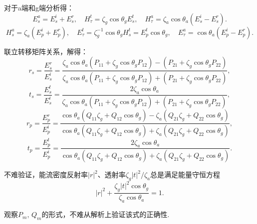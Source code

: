 对于a端和g端分析得：
\begin{equation*}
	E_s^a = E_s^i + E_s^r,\quad H_\tau^t = \zeta_g \cos\theta_g E_s^t,\quad H_\tau^a = \zeta_a \cos\theta_a (E_s^i - E_s^r).
\end{equation*}
\begin{equation*}
	H_s^a = \zeta_a (E_p^i + E_p^r),\quad E_\tau^t = \zeta_g^{-1} \cos\theta_g H_s^t = E_p^t \cos\theta_g,\quad E_\tau^a = \cos\theta_a (E_p^i - E_p^r).
\end{equation*}

联立转移矩阵关系，解得：
\begin{equation*}
	r_s = \dfrac{E_s^r}{E_s^i} = \dfrac{\zeta_a \cos\theta_a (P_{11} + \zeta_g \cos\theta_g P_{12}) - (P_{21} + \zeta_g \cos\theta_g P_{22})}{\zeta_a \cos\theta_a (P_{11} + \zeta_g \cos\theta_g P_{12}) + (P_{21} + \zeta_g \cos\theta_g P_{22})},
\end{equation*}
\begin{equation*}
	t_s = \dfrac{E_s^t}{E_s^i} = \dfrac{2\zeta_a \cos\theta_a}{\zeta_a \cos\theta_a (P_{11} + \zeta_g \cos\theta_g P_{12}) + (P_{21} + \zeta_g \cos\theta_g P_{22})},
\end{equation*}
\begin{equation*}
	r_p = \dfrac{E_p^r}{E_p^i} = \dfrac{\cos\theta_a (Q_{11}\zeta_g + Q_{12}\cos\theta_g) - \zeta_a (Q_{21}\zeta_g + Q_{22}\cos\theta_g)}{\cos\theta_a (Q_{11}\zeta_g + Q_{12}\cos\theta_g) + \zeta_a (Q_{21}\zeta_g + Q_{22}\cos\theta_g)},
\end{equation*}
\begin{equation*}
	t_p = \dfrac{E_p^t}{E_p^i} = \dfrac{2\zeta_a \cos\theta_a}{\cos\theta_a (Q_{11}\zeta_g + Q_{12}\cos\theta_g) + \zeta_a (Q_{21}\zeta_g + Q_{22}\cos\theta_g)}.
\end{equation*}

不难验证，能流密度反射率\(|r|^2\)、透射率\(\zeta_g |t|^2/\zeta_a\)总是满足能量守恒方程
\begin{equation*}
	|r|^2+\dfrac{\zeta_g|t|^2\cos\theta_g}{\zeta_a \cos\theta_a}=1.
\end{equation*}

观察\(P_m,\,Q_m\)的形式，不难从解析上验证该式的正确性.

